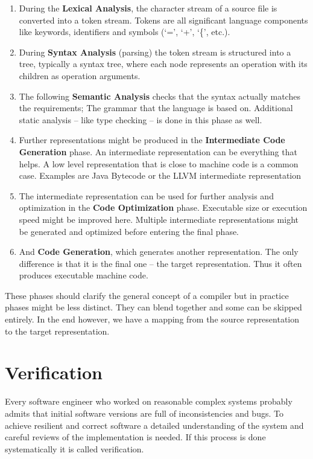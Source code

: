 \begin{enumerate}
  \item During the \textbf{Lexical Analysis}, the character stream of a source file is converted into a token stream.
  Tokens are all significant language components like keywords, identifiers and symbols (`=', `+', `\{', etc.).
  \item During \textbf{Syntax Analysis} (parsing) the token stream is structured into a tree,
  typically a syntax tree, where each node represents an operation with its children as operation arguments.
  \item The following \textbf{Semantic Analysis} checks that the syntax actually matches the requirements;
  The grammar that the language is based on.\newline
  Additional static analysis -- like type checking -- is done in this phase as well.
  \item Further representations might be produced in the \textbf{Intermediate Code Generation} phase.
  An intermediate representation can be everything that helps.
  A low level representation that is close to machine code is a common case.
  Examples are Java Bytecode or the LLVM intermediate representation
  \item The intermediate representation can be used for further analysis and optimization in the \textbf{Code Optimization} phase.
  Executable size or execution speed might be improved here.
  Multiple intermediate representations might be generated and optimized before entering the final phase.
  \item And \textbf{Code Generation}, which generates another representation.
  The only difference is that it is the final one -- the target representation.
  Thus it often produces executable machine code.
\end{enumerate}

These phases should clarify the general concept of a compiler but in practice phases might be less distinct.
They can blend together and some can be skipped entirely.
In the end however, we have a mapping from the source representation to the target representation.

\section{Verification}
\label{rel_mc}
Every software engineer who worked on reasonable complex systems probably admits that initial software versions are full of inconsistencies and bugs.
To achieve resilient and correct software a detailed understanding of the system and careful reviews of the implementation is needed.
If this process is done systematically it is called verification.

